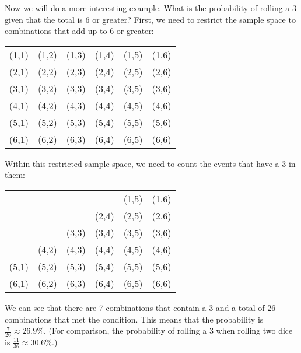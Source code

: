 \documentclass{ximera}
\begin{document}
Now we will do a more interesting example. What is the probability of rolling a 3 given that the total is 6 or greater? First, we need to restrict the sample space to combinations that add up to 6 or greater:
    \begin{image} \begin{tabular}{cccccc}
      (1,1) & (1,2) & (1,3) & (1,4) & \cellcolor{lightgray}(1,5) & \cellcolor{lightgray}(1,6) \\
      (2,1) & (2,2) & (2,3) & \cellcolor{lightgray}(2,4) & \cellcolor{lightgray}(2,5) & \cellcolor{lightgray}(2,6) \\
      (3,1) & (3,2) & \cellcolor{lightgray}(3,3) & \cellcolor{lightgray}(3,4) & \cellcolor{lightgray}(3,5) & \cellcolor{lightgray}(3,6) \\
      (4,1) & \cellcolor{lightgray}(4,2) & \cellcolor{lightgray}(4,3) & \cellcolor{lightgray}(4,4) & \cellcolor{lightgray}(4,5) & \cellcolor{lightgray}(4,6) \\
      \cellcolor{lightgray}(5,1) & \cellcolor{lightgray}(5,2) & \cellcolor{lightgray}(5,3) & \cellcolor{lightgray}(5,4) & \cellcolor{lightgray}(5,5) & \cellcolor{lightgray}(5,6) \\
      \cellcolor{lightgray}(6,1) & \cellcolor{lightgray}(6,2) & \cellcolor{lightgray}(6,3) & \cellcolor{lightgray}(6,4) & \cellcolor{lightgray}(6,5) & \cellcolor{lightgray}(6,6) \\
    \end{tabular} \end{image}  
Within this restricted sample space, we need to count the events that have a 3 in them:
\begin{image} \begin{tabular}{cccccc}
     &  &  &  & (1,5) & (1,6) \\
     &  &  & (2,4) & (2,5) & (2,6) \\
     &  & \cellcolor{lightgray}(3,3) & \cellcolor{lightgray}(3,4) & \cellcolor{lightgray}(3,5) & \cellcolor{lightgray}(3,6) \\
     & (4,2) & \cellcolor{lightgray}(4,3) & (4,4) & (4,5) & (4,6) \\
    (5,1) & (5,2) & \cellcolor{lightgray}(5,3) & (5,4) & (5,5) & (5,6) \\
    (6,1) & (6,2) & \cellcolor{lightgray}(6,3) & (6,4) & (6,5) & (6,6) \\
\end{tabular} \end{image}
We can see that there are 7 combinations that contain a 3 and a total of 26 combinations that met the condition. This means that the probability is $\frac{7}{26} \approx 26.9\%$. (For comparison, the probability of rolling a 3 when rolling two dice is $\frac{11}{36} \approx 30.6\%$.)
\end{document}
